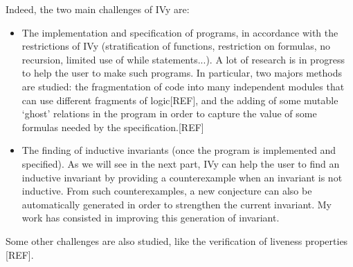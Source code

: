 \documentclass[11pt,a4paper,oldfontcommands,openany]{memoir}
\begin{document}
    Indeed, the two main challenges of IVy are:
    \begin{itemize}
        \item The implementation and specification of programs, in accordance with the restrictions of IVy
        (stratification of functions, restriction on formulas, no recursion, limited use of while statements...).
        A lot of research is in progress to help the user to make such programs. In particular, two majors methods are
        studied: the fragmentation of code into many independent modules that can use different fragments of logic[REF],
        and the adding of some mutable `ghost' relations in the program in order to capture the value of some formulas needed by the specification.[REF]
        
        \item The finding of inductive invariants (once the program is implemented and specified). As we will see in the next part,
        IVy can help the user to find an inductive invariant by providing a counterexample when an invariant is not inductive.
        From such counterexamples, a new conjecture can also be automatically generated in order to strengthen the current invariant.
        My work has consisted in improving this generation of invariant.
    \end{itemize}

    Some other challenges are also studied, like the verification of liveness properties [REF].

\end{document}
